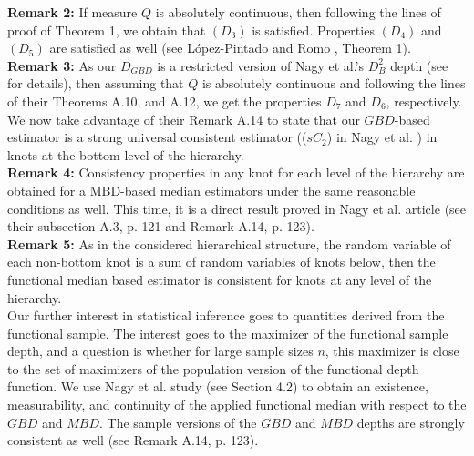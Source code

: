 \documentclass[12pt,a4paper]{article}
\numberwithin{equation}{section}
\begin{document}
\vspace{2mm}
\textbf{Remark 2:} 
If measure $Q$ is absolutely continuous, then following the lines of proof of \cite{LopezRomo} Theorem 1, we obtain that $(D_3)$ is satisfied. Properties $(D_4)$ and $(D_5)$ are satisfied as well (see L\'opez-Pintado and Romo \cite{LopezRomo}, Theorem 1). 
\vspace{2mm}
\\ \textbf{Remark 3:} As our $D_{GBD}$ is a restricted version of Nagy et al.'s $D_B^2$ depth (see \cite{Nagy} for details), then assuming that $Q$ is absolutely continuous and following the lines of their Theorems A.10, and A.12, we get the properties $D_7$ and $D_6$, respectively. We now take advantage of their Remark A.14 to state that our $GBD$-based estimator is a strong universal consistent estimator (($sC_2$) in Nagy et al. \cite{Nagy}) in knots at the bottom level of the hierarchy.%
\vspace{2mm}
\\ \textbf{Remark 4:} Consistency properties in any knot for each level of the hierarchy are obtained for a MBD-based median estimators under the same reasonable conditions as well. This time, it is a direct result proved in Nagy et al. article \cite{Nagy} (see their subsection A.3, p. 121 and Remark A.14, p. 123).
\vspace{2mm}
\\ \textbf{Remark 5:} As in the considered hierarchical structure,  the random variable of each non-bottom knot is a sum of random variables of knots below, then the functional median based estimator is consistent for knots at any level of the hierarchy.
\vspace{2mm}
\\ Our further interest in statistical inference goes to quantities derived from the functional sample. The interest goes to the maximizer of the functional sample depth, and a question is whether for large sample sizes $n$, this maximizer is close to the set of maximizers of the population version of the functional depth function. We use Nagy et al. study \cite{Nagy} (see Section 4.2) to obtain an existence, measurability, and continuity of the applied functional median with respect to the $GBD$ and $MBD$. 
The sample versions of the $GBD$ and $MBD$ depths are strongly consistent as well (see Remark A.14, p. 123).
\end{document}
